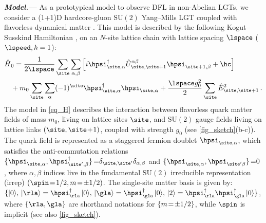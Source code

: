 \documentclass[aps,prl,reprint,twocolumn,superscriptaddress,floatfix,nofootinbib]{revtex4-2}
\begin{document}
\textbf{\textit{Model.---}}
As a prototypical model to observe DFL in non-Abelian LGTs, we consider a (1+1)D hardcore-gluon $\mathrm{SU}(2)$ Yang--Mills LGT coupled with flavorless dynamical matter \cite{SM, Cataldi2024Simulating2+1DSU2, Calajo2024DigitalQuantumSimulation, Calajo2025QuantumManybodyScarring}.
This model is described by the following Kogut--Susskind Hamiltonian \cite{Kogut1975HamiltonianFormulationWilsons}, on an $N$-site lattice chain with lattice spacing $\lspace$ ($\lspeed,\hbar=1$):
\begin{equation}
    \label{eq_H}
    \begin{split}
        \hat{H} & _0=\frac{1}{2\lspace}\sum_{\site}\sum_{\alpha, \beta}
        \qty[i\hpsi^{\dagger}_{\site,\alpha}\hat{U}^{\alpha\beta}_{\site,\site+1}\hpsi_{\site+1,\beta}+\hc]      \\
                & + m_0\sum_{\site}\sum_{\alpha} (-1)^{\site} \hpsi^{\dagger}_{\site,\alpha}\hpsi_{\site,\alpha}
        + \frac{\lspace g_0^2}{2}\sum_{\site}\hat{E}^2_{\site,\site+1}
        \,.
    \end{split}
\end{equation}
The model in \cref{eq_H} describes the interaction between flavorless quark matter fields of mass $m_0$, living on lattice sites $\site$,
and $\mathrm{SU}(2)$ gauge fields living on lattice links $(\site, \site\!+\!1)$, coupled with strength $g_{0}$ (see \cref{fig_sketch}(b-c)).
The quark field is represented as a staggered fermion doublet $\hpsi_{\site,\alpha}$, which satisfies the anti-commutation relations
$\acomm*{\hpsi_{\site,\alpha}}{\hpsi^{\dagger}_{\site^{\prime},\beta}}{=} \delta_{\site,\site^{\prime}} \delta_{\alpha, \beta}$ and $\acomm*{\hpsi_{\site,\alpha}}{\hpsi_{\site^{\prime}\beta}}{=}0$
\cite{Susskind1977LatticeFermions}, where $\alpha, \beta$ indices live in the fundamental $\mathrm{SU}(2)$ irreducible representation (irrep) $(\spin\!=\!1/2, m\!=\!\pm1/2)$.
The single-site matter basis is given by:
\begin{math}
    \{
    {\ket{0}},\,
    {\ket{\rla} = \hpsi^{\dagger}_{\rla}\ket{0}},\,
    {\ket{\gla} = \hpsi^{\dagger}_{\gla}\ket{0}},\,
    {\ket{2}    = \hpsi^{\dagger}_{\rla} \hpsi^{\dagger}_{\gla}\ket{0}}
    \}
\end{math},
where $\qty{\rla,\gla}$ are shorthand notations for $\qty{m\!=\!\pm1/2}$, while $\spin$ is implicit \cite{Cataldi2024Simulating2+1DSU2, Calajo2024DigitalQuantumSimulation, Calajo2025QuantumManybodyScarring} (see also \cref{fig_sketch}).
\end{document}
